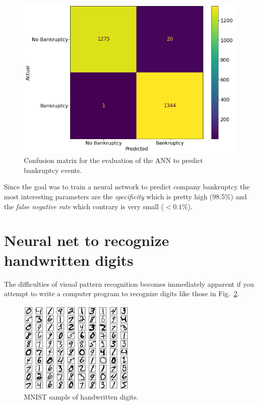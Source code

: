\begin{figure}[htbp]
\centering
\includegraphics[width=0.7\linewidth]{figures/confusion_matrix}
\caption{Confusion matrix for the evaluation of the ANN to predict bankruptcy events.}
\label{fig:confusion_matrix}
\end{figure}

Since the goal was to train a neural network to predict company bankruptcy the most interesting parameters are the \emph{specificity} which is pretty high (98.5\%) and the \emph{false negative rate} which contrary is very small ($\lt 0.1\%$).

\section{Neural net to recognize handwritten digits}
\label{neural-net-to-recognize-handwritten-digits}

The difficulties of visual pattern recognition becomes immediately apparent if you attempt to write a computer program to recognize digits like those in Fig.~\ref{fig:mnist}.

\begin{figure}[b]
\centering
\includegraphics[width=0.5\textwidth]{figures/mnist_100_digits}
\caption{MNIST sample of handwritten digits.}
\label{fig:mnist}
\end{figure}

